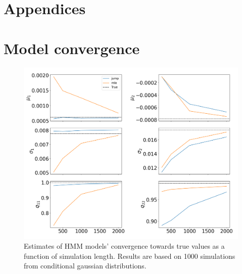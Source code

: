 \newpage

\appendix
\section{Appendices}


\section{Model convergence}
\label{appendix:model_convergence}

\begin{figure}[H] 
    \centering
    \includegraphics[width=1\textwidth]{analysis/model_convergence/images/simulation_normal.png}
    \caption{Estimates of HMM models' convergence towards true values as a function of simulation length. Results are based on 1000 simulations from conditional gaussian distributions.}
    \label{fig:jump_normal}
\end{figure}

